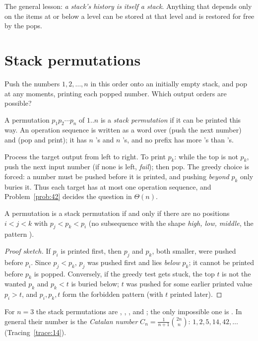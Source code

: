 The general lesson: \emph{a stack's history is itself a stack}. Anything that depends
only on the items at or below a level can be stored at that level and is restored for
free by the pops.

\section{Stack permutations}\label{sec:stackperm}

Push the numbers $1,2,\dots,n$ in this order onto an initially empty stack, and pop at
any moments, printing each popped number. Which output orders are possible?

\begin{definition}
A permutation $p_1p_2\cdots p_n$ of $1..n$ is a \emph{stack permutation} if it can be
printed this way. An operation sequence is written as a word over  (push the next
number) and  (pop and print); it has $n$ 's and $n$ 's, and no prefix
has more 's than 's.
\end{definition}

 Process the target output from left to right. To print $p_k$: while
the top is not $p_k$, push the next input number (if none is left, \emph{fail}); then
pop. The greedy choice is forced: a number must be pushed before it is printed, and
pushing \emph{beyond} $p_k$ only buries it. Thus each target has at most one operation
sequence, and Problem~\ref{prob:42} decides the question in $\Theta(n)$.

\begin{theorem}
A permutation is a stack permutation if and only if there are no positions $i<j<k$ with
$p_j<p_k<p_i$ (no subsequence with the shape \emph{high, low, middle}, the pattern
).
\end{theorem}
\begin{proof}[Proof sketch]
If $p_i$ is printed first, then $p_j$ and $p_k$, both smaller, were pushed before $p_i$.
Since $p_j<p_k$, $p_j$ was pushed first and lies \emph{below} $p_k$; it cannot be printed
before $p_k$ is popped. Conversely, if the greedy test gets stuck, the top $t$ is not the
wanted $p_k$ and $p_k<t$ is buried below; $t$ was pushed for some earlier printed value
$p_i>t$, and $p_i,p_k,t$ form the forbidden pattern (with $t$ printed later).
\end{proof}

For $n=3$ the stack permutations are , , ,  and ;
the only impossible one is . In general their number is the \emph{Catalan
number} $C_n=\frac{1}{n+1}\binom{2n}{n}$: $1,2,5,14,42,\dots$ (Tracing~\ref{trace:14}).

